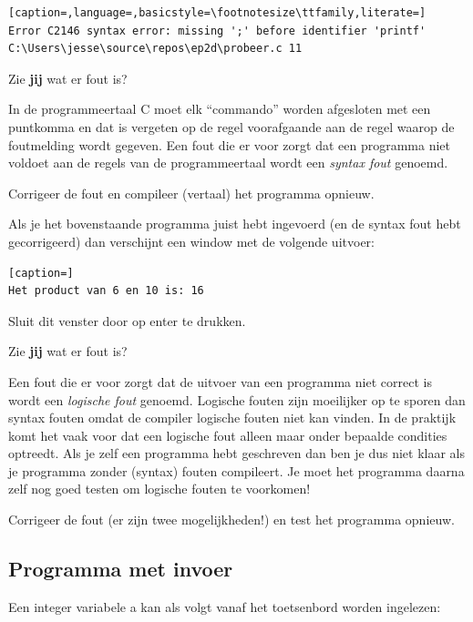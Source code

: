 \documentclass[a4paper,10pt,fleqn,twoside]{article}
\begin{document}
\begin{lstlisting}[caption=,language=,basicstyle=\footnotesize\ttfamily,literate=]
Error C2146 syntax error: missing ';' before identifier 'printf' C:\Users\jesse\source\repos\ep2d\probeer.c	11	
\end{lstlisting}

Zie \textbf{jij} wat er fout is?

In de programmeertaal C moet elk ``commando'' worden afgesloten met een puntkomma en dat is vergeten op de regel voorafgaande aan de regel waarop de foutmelding wordt gegeven. Een fout die er voor zorgt dat een programma niet voldoet aan de regels van de programmeertaal wordt een \textsl{syntax fout} genoemd.

Corrigeer de fout en compileer (vertaal) het programma opnieuw.

Als je het bovenstaande programma juist hebt ingevoerd (en de syntax fout hebt gecorrigeerd) dan verschijnt een window met de volgende uitvoer:

\begin{lstlisting}[caption=]
Het product van 6 en 10 is: 16
\end{lstlisting}

Sluit dit venster door op enter te drukken.

Zie \textbf{jij} wat er fout is?

Een fout die er voor zorgt dat de uitvoer van een programma niet correct is wordt een \textsl{logische fout} genoemd. Logische fouten zijn moeilijker op te sporen dan syntax fouten omdat de compiler logische fouten niet kan vinden. In de praktijk komt het vaak voor dat een logische fout alleen maar onder bepaalde condities optreedt. Als je zelf een programma hebt geschreven dan ben je dus niet klaar als je programma zonder (syntax) fouten compileert. Je moet het programma daarna zelf nog goed testen om logische fouten te voorkomen! 

Corrigeer de fout (er zijn twee mogelijkheden!) en test het programma opnieuw.

\subsection{Programma met invoer}
Een integer variabele a kan als volgt vanaf het toetsenbord worden ingelezen:
\end{document}
